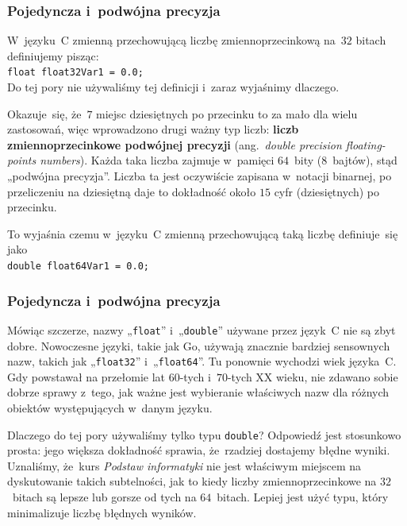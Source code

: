 \documentclass[10pt,t]{beamer}
\begin{document}
\begin{frame}
  \frametitle{Pojedyncza i~podwójna precyzja}


  W~języku~C zmienną przechowującą liczbę zmiennoprzecinkową na~$32$ bitach
  definiujemy pisząc: \\
  \texttt{float float32Var1 = 0.0;} \\
  Do tej pory nie używaliśmy tej definicji i~zaraz wyjaśnimy dlaczego.

  Okazuje~się, że~$7$ miejsc dziesiętnych po przecinku to za mało dla
  wielu zastosowań, więc wprowadzono drugi ważny typ liczb:
  \textbf{liczb zmiennoprzecinkowe podwójnej precyzji}
  (ang.~\textit{double precision floating-points numbers}). Każda
  taka liczba zajmuje w~pamięci $64$~bity ($8$~bajtów), stąd „podwójna
  precyzja”. Liczba ta jest oczywiście zapisana w~notacji binarnej, po
  przeliczeniu na dziesiętną daje to dokładność około $15$ cyfr
  (dziesiętnych) po przecinku.

  To wyjaśnia czemu w~języku~C zmienną przechowującą taką liczbę
  definiuje~się jako \\
  \texttt{double float64Var1 = 0.0;} \\

\end{frame}





\begin{frame}
  \frametitle{Pojedyncza i~podwójna precyzja}


  Mówiąc szczerze, nazwy „\texttt{float}” i~„\texttt{double}” używane przez
  język~C nie są zbyt dobre. Nowoczesne języki, takie jak Go, używają
  znacznie bardziej sensownych nazw, takich jak „\texttt{float32}”
  i~„\texttt{float64}”. Tu ponownie wychodzi wiek języka~C. Gdy powstawał
  na przełomie lat $60$-tych i~$70$-tych XX wieku, nie zdawano sobie dobrze
  sprawy z~tego, jak ważne jest wybieranie właściwych nazw dla różnych
  obiektów występujących w~danym języku.

  Dlaczego do tej pory używaliśmy tylko typu \texttt{double}? Odpowiedź jest
  stosunkowo prosta: jego większa dokładność sprawia, że~rzadziej dostajemy
  błędne wyniki. Uznaliśmy, że~kurs \textit{Podstaw informatyki} nie jest
  właściwym miejscem na dyskutowanie takich subtelności, jak to kiedy
  liczby zmiennoprzecinkowe na $32$~bitach są lepsze lub gorsze od tych
  na $64$~bitach. Lepiej jest użyć typu, który minimalizuje liczbę błędnych
  wyników.

\end{frame}
\end{document}
